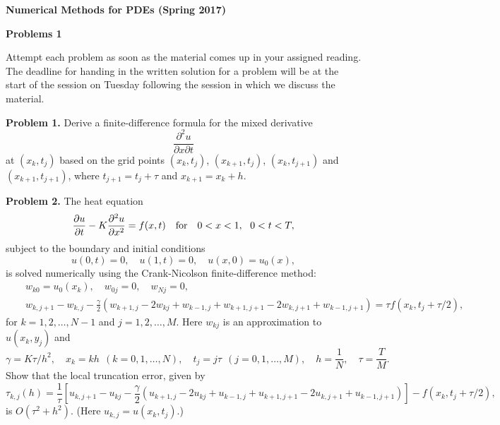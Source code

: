 \documentclass[10pt]{article}
\begin{document}
\begin{center}
{\large {\bf Numerical Methods for PDEs (Spring 2017)}}
\end{center}


\begin{center}
{\large {\bf Problems 1}}
\end{center}

\vskip 0.5cm
\noindent
Attempt each problem as soon as the material comes up in your assigned reading. The deadline for handing in the written solution for a problem will be at the start of the session on Tuesday
following the session in which we discuss the material.

\vskip 0.5cm
\noindent
{\bf Problem 1.} Derive a finite-difference formula for
the mixed derivative
\[
\frac{\partial^2 u}{\partial x\partial t}
\]
at $(x_{k},t_{j})$ based on the grid points $(x_{k},t_{j})$, $(x_{k+1},t_{j})$, $(x_{k},t_{j+1})$ and
$(x_{k+1},t_{j+1})$, where $t_{j+1}=t_{j}+\tau$ and $x_{k+1}=x_{k}+h$.


\vskip 0.5cm
\noindent
{\bf Problem 2.} The heat equation
\begin{equation}
\frac{\partial u}{\partial t}-K \frac{\partial^{2}u}{\partial
x^{2}}=f(x,t) \quad \hbox{for} \quad 0<x<1, \ \ 0 < t < T, \label{1}
\end{equation}
subject to the boundary and initial conditions
\begin{equation}
u(0,t)=0, \quad u(1, t)=0, \quad u(x,0)=u_{0}(x), \label{2}
\end{equation}
is solved numerically using the Crank-Nicolson finite-difference method:
\begin{eqnarray}
&&w_{k0}=u_{0}(x_{k}), \quad w_{0j}=0, \quad w_{Nj}=0,   \nonumber \\
&&w_{k,j+1}-w_{k,j}-\frac{\gamma}{2} \left(
w_{k+1,j}-2w_{kj}+w_{k-1,j}+w_{k+1,j+1}-2w_{k,j+1}+w_{k-1,j+1}\right)
=\tau f(x_{k}, t_{j}+\tau/2),  \label{4}
\end{eqnarray}
for $k=1, 2, \dots , N-1$ and $j=1, 2, \dots,M$.
Here $w_{kj}$ is an approximation to $u(x_{k}, y_{j})$ and
\[
\gamma=K\tau/h^{2}, \quad x_{k}=k h \ \ (k=0,1,\dots,N), \quad
t_{j}=j \tau \ \ (j=0,1,\dots,M), \quad h=\frac{1}{N}, \quad \tau=\frac{T}{M}.
\]
Show that the local truncation error, given by
\[
\tau_{k,j}(h)=\frac{1}{\tau}\left[u_{k,j+1}-u_{kj}-\frac{\gamma}{2}
\left(
u_{k+1,j}-2u_{kj}+u_{k-1,j}+u_{k+1,j+1}-2u_{k,j+1}+u_{k-1,j+1}\right)\right]
-f(x_{k}, t_{j}+\tau/2),
\]
is $O(\tau^{2}+h^{2})$. (Here $u_{k,j}=u(x_{k}, t_{j})$.)
\end{document}
